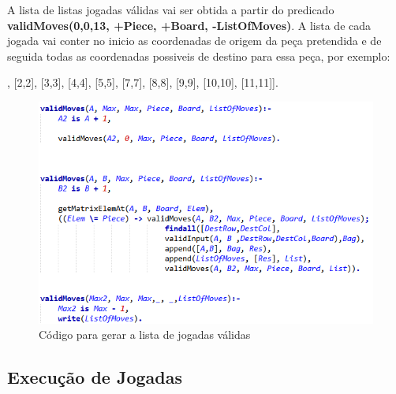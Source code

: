 \documentclass[a4paper]{article}
\begin{document}
\par A lista de listas jogadas válidas vai ser obtida a partir do predicado \textbf{validMoves(0,0,13, +Piece, +Board, -ListOfMoves)}. A lista de cada jogada vai conter no inicio as coordenadas de origem da peça pretendida e de seguida todas as coordenadas possiveis de destino para essa peça, por exemplo: 
\par [ [0, 0, [1,1], [2,2], [3,3], [4,4], [5,5], [7,7], [8,8], [9,9], [10,10], [11,11]]. 
\begin{figure}[h!]

\hspace*{-0.5cm}\includegraphics[scale=0.85]{listajogadas.png}
\caption{Código para gerar a lista de jogadas válidas}

\end{figure}


\subsection{Execução de Jogadas}
\end{document}
